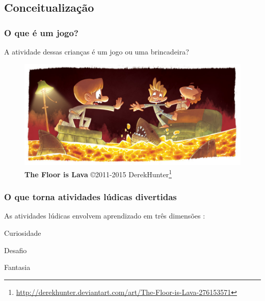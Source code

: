 \expandafter\documentclass\expandafter[table, usenames, svgnames, dvipsnames, \classopts]{beamer}
\begin{document}
\subsection{Conceitualização}

\begin{frame}
	\frametitle{\textbf{O que é um jogo?}}

	\begin{center}
		A atividade dessas crianças é um jogo ou uma brincadeira?
	\end{center}	

	\vspace{-2em}
	
	\begin{figure}
		\centering
		\includegraphics[width=0.9\paperwidth]{floor-is-lava}
		\caption{\textbf{The Floor is Lava} \copyright{2011-2015} DerekHunter\footnote{\url{http://derekhunter.deviantart.com/art/The-Floor-is-Lava-276153571}}}
	\end{figure}
	
	\vspace{2em}

\end{frame}

\begin{frame}
	\frametitle{\textbf{O que torna atividades lúdicas divertidas}}

	As atividades lúdicas envolvem aprendizado em três dimensões \cite{Malone1980}:

	\vspace{1em}

	\begin{outline}
		\1 Curiosidade
			
		\vspace{1em}
		
		\1 Desafio
					
		\vspace{1em}
		
		\1 Fantasia
	\end{outline}
\end{frame}
\end{document}
